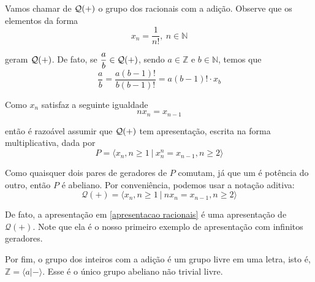 	\par\vspace{0.3cm} Vamos chamar de $\cal{Q}(+)$ o grupo dos racionais com a adição. Observe que os elementos da forma
	\begin{equation*}
	x_n = \frac{1}{n!}, \ n\in\mathbb{N}
	\end{equation*}
	\par\vspace{0.3cm} geram $\cal{Q}(+)$. De fato, se $\displaystyle{ \frac{a}{b}\in\cal{Q}(+) }$, sendo $a\in\mathbb{Z}$ e $b\in\mathbb{N}$, temos que
	\begin{equation*}
	\frac{a}{b} = \frac{a(b-1)!}{b(b-1)!} = a(b-1)!\cdot x_b
	\end{equation*}
	\par\vspace{0.3cm} Como $x_n$ satisfaz a seguinte igualdade
	\begin{equation*}
	nx_n = x_{n-1}
	\end{equation*}
	\par\vspace{0.3cm} então é razoável assumir que $\cal{Q}(+)$ tem apresentação, escrita na forma multiplicativa, dada por
	\begin{equation*}
	P = \langle x_n, n\geq 1 \ | \ x_n^n = x_{n-1}, n\geq 2 \rangle
	\end{equation*}
	\par\vspace{0.3cm} Como quaisquer dois pares de geradores de $P$ comutam, já que um é potência do outro, então $P$ é abeliano. Por conveniência, podemos usar a notação aditiva:
	\begin{equation}
	\mathcal{Q}(+) = \langle x_n, n\geq 1 \ | \ nx_n = x_{n-1}, n\geq 2 \rangle
	\label{apresentacao racionais}
	\end{equation}
	\par\vspace{0.3cm} De fato, a apresentação em \eqref{apresentacao racionais} é uma apresentação de $\mathcal{Q}(+)$. Note que ela é o nosso primeiro exemplo de apresentação com infinitos geradores.
	\par\vspace{0.3cm} Por fim, o grupo dos inteiros com a adição é um grupo livre em uma letra, isto é, $\mathbb{Z} = \langle a|- \rangle$. Esse é o único grupo abeliano não trivial livre.
	
	
